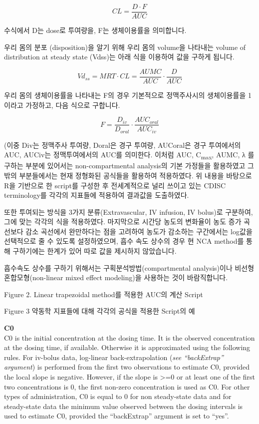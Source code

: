 \documentclass[12pt,]{krantz}
\begin{document}
\[
CL = \frac{D \cdot F}{AUC}
\]

수식에서 D는 dose로 투여량을, F는 생체이용률을 의미합니다.

우리 몸의 분포 (disposition)을 알기 위해 우리 몸의 volume을 나타내는 volume of distribution at steady state (Vdss)는 아래 식을 이용하여 값을 구하게 됩니다.

\[
Vd_{ss} = MRT \cdot CL = \frac{AUMC}{AUC} \cdot \frac{D}{AUC}
\]

우리 몸의 생체이용률을 나타내는 F의 경우 기본적으로 정맥주사시의 생체이용률을 1이라고 가정하고, 다음 식으로 구합니다.

\[
F = \frac{D_{iv}}{D_{oral}} \cdot \frac{AUC_{oral}}{AUC_{iv}}
\]

(이중 Div는 정맥주사 투여량, Doral은 경구 투여량, AUCoral은 경구 투여에서의 AUC, AUCiv는 정맥투여에서의 AUC를 의미한다.
이처럼 AUC, C\textsubscript{max}, AUMC, λ 를 구하는 부분에 있어서는 non-compartmental analysis의 기본 가정들을 활용하였고 그 밖의 부분들에서는 현재 정형화된 공식들을 활용하여 적용하였다.
위 내용을 바탕으로 R을 기반으로 한 script를 구성한 후 전세계적으로 널리 쓰이고 있는 CDISC terminology를 각각의 지표들에 적용하여 결과값을 도출하였다.

또한 투여되는 방식을 3가지 분류(Extravascular, IV infusion, IV bolus)로 구분하여, 그에 맞는 각각의 식을 적용하였다.
마지막으로 시간당 농도의 변화율이 농도 증가 곡선보다 감소 곡선에서 완만하다는 점을 고려하여 농도가 감소하는 구간에서는 log값을 선택적으로 줄 수 있도록 설정하였으며, 흡수 속도 상수의 경우 현 NCA method를 통해 구하기에는 한계가 있어 따로 값을 제시하지 않았습니다.

흡수속도 상수를 구하기 위해서는 구획분석방법(compartmental analysis)이나 비선형 혼합모형(non-linear mixed effect modeling)을 사용하는 것이 바람직합니다.

Figure 2. Linear trapezoidal method를 적용한 AUC의 계산 Script

Figure 3 약동학 지표들에 대해 각각의 공식을 적용한 Script의 예

\textbf{C0}\\
C0 is the initial concentration at the dosing time. It is the observed concentration at the dosing time, if available. Otherwise it is approximated using the following rules. For iv-bolus data, log-linear back-extrapolation (\emph{see ``backExtrap'' argument}) is performed from the first two observations to estimate C0, provided the local slope is negative. However, if the slope is \textgreater=0 or at least one of the first two concentrations is 0, the first non-zero concentration is used as C0. For other types of administration, C0 is equal to 0 for non steady-state data and for steady-state data the minimum value observed between the dosing intervals is used to estimate C0, provided the ``backExtrap'' argument is set to ``yes''.
\end{document}
